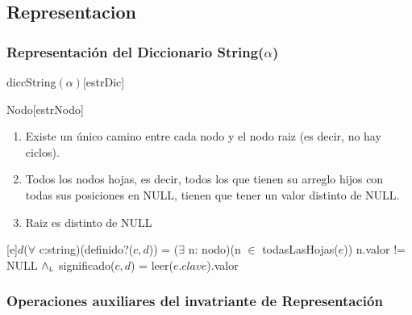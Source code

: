\subsection{Representacion}
  
  \subsubsection{Representaci\'on del Diccionario String($\alpha$)}
  \begin{Estructura}{diccString$(\alpha)$}[estrDic]
    \begin{Tupla}[estrDic]
    \end{Tupla}
\end{Estructura}

  \begin{Estructura}{Nodo}[estrNodo]
    \begin{Tupla}[estrNodo]
    \end{Tupla}
\end{Estructura}


\renewcommand{\labelenumi}{(\Roman{enumi})}
 \begin{enumerate}
 	\item Existe un \'unico camino entre cada nodo y el nodo raiz (es decir, no hay ciclos).
 	\item Todos los nodos hojas, es decir, todos los que tienen su arreglo hijos con todas sus posiciones en NULL, tienen que tener un valor distinto de NULL.
 	\item Raiz es distinto de NULL
  \end{enumerate}

\mbox{}

 [e]{$d$}{($\forall$ c:string)(definido?($c,d$)) = ($\exists$ n: nodo)(n $\in$ todasLasHojas($e$)) n.valor != NULL $\land_{\mathrm{\scriptscriptstyle{L}}}$ significado($c,d$) = leer($e.clave$).valor}


 \subsubsection{Operaciones auxiliares del invatriante de Representaci\'on}

